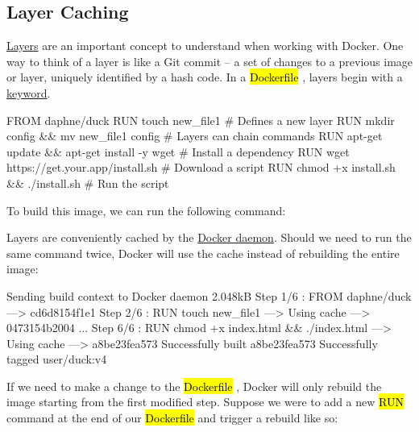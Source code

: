 \documentclass[12pt,initial,twoside,maitrise]{dms}
\newcommand{\inline}[1]{%
    \begingroup%
    \sethlcolor{slightgray}%
    \hl{\ttfamily\small #1}%
    \endgroup
}
\numberwithin{equation}{section}
\numberwithin{table}{chapter}
\numberwithin{figure}{chapter}
\begin{document}
\subsection{Layer Caching}

\href{https://docs.docker.com/storage/storagedriver/#images-and-layers}{Layers} are an important concept to understand when working with Docker. One way to think of a layer is like a Git commit -- a set of changes to a previous image or layer, uniquely identified by a hash code. In a \inline{Dockerfile}, layers begin with a \href{https://docs.docker.com/engine/reference/builder/#from}{keyword}.

\begin{dockerlisting}
FROM daphne/duck
RUN touch new_file1                            # Defines a new layer
RUN mkdir config && mv new_file1 config        # Layers can chain commands
RUN apt-get update && apt-get install -y wget  # Install a dependency
RUN wget https://get.your.app/install.sh       # Download a script
RUN chmod +x install.sh && ./install.sh        # Run the script
\end{dockerlisting}
%
To build this image, we can run the following command:

%
Layers are conveniently cached by the \href{https://docs.docker.com/engine/reference/commandline/dockerd/}{Docker daemon}. Should we need to run the same command twice, Docker will use the cache instead of rebuilding the entire image:

\begin{pclisting}
Sending build context to Docker daemon  2.048kB
Step 1/6 : FROM daphne/duck
---> cd6d8154f1e1
Step 2/6 : RUN touch new_file1
---> Using cache
---> 0473154b2004
...
Step 6/6 : RUN chmod +x index.html && ./index.html
---> Using cache
---> a8be23fea573
Successfully built a8be23fea573
Successfully tagged user/duck:v4
\end{pclisting}
%
If we need to make a change to the \inline{Dockerfile}, Docker will only rebuild the image starting from the first modified step. Suppose we were to add a new \inline{RUN} command at the end of our \inline{Dockerfile} and trigger a rebuild like so:
\end{document}
